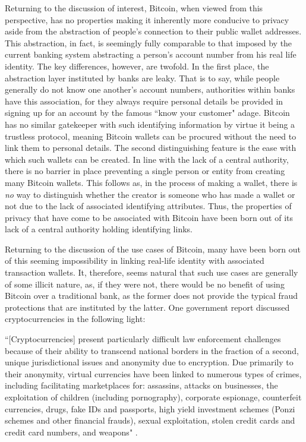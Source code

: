 \documentclass{article}
\begin{document}
Returning to the discussion of interest, Bitcoin, when viewed from this perspective, has no properties making it inherently more conducive to privacy aside from the abstraction of people's connection to their public wallet addresses. This abstraction, in fact, is seemingly fully comparable to that imposed by the current banking system abstracting a person's account number from his real life identity. The key differences, however, are twofold. In the first place, the abstraction layer instituted by banks are leaky. That is to say, while people generally do not know one another's account numbers, authorities within banks have this association, for they always require personal details be provided in signing up for an account by the famous ``know your customer" adage. Bitcoin has no similar gatekeeper with such identifying information by virtue it being a trustless protocol, meaning Bitcoin wallets can be procured without the need to link them to personal details. The second distinguishing feature is the ease with which such wallets can be created. In line with the lack of a central authority, there is no barrier in place preventing a single person or entity from creating many Bitcoin wallets. This follows as, in the process of making a wallet, there is \textit{no} way to distinguish whether the creator is someone who has made a wallet or not due to the lack of associated identifying attributes. Thus, the properties of privacy that have come to be associated with Bitcoin have been born out of its lack of a central authority holding identifying links. 

Returning to the discussion of the use cases of Bitcoin, many have been born out of this seeming impossibility in linking real-life identity with associated transaction wallets. It, therefore, seems natural that such use cases are generally of some illicit nature, as, if they were not, there would be no benefit of using Bitcoin over a traditional bank, as the former does not provide the typical fraud protections that are instituted by the latter. One government report discussed cryptocurrencies in the following light:

``[Cryptocurrencies] present particularly difficult law enforcement challenges because of their ability to transcend national borders in the fraction of a second, unique jurisdictional issues and anonymity due to encryption. Due primarily to their anonymity, virtual currencies have been linked to numerous types of crimes, including facilitating marketplaces for: assassins, attacks on businesses, the exploitation of children (including pornography), corporate espionage, counterfeit currencies, drugs, fake IDs and passports, high yield investment schemes (Ponzi schemes and other financial frauds), sexual exploitation, stolen credit cards and credit card numbers, and weapons" \cite{virtual}. 
\end{document}
